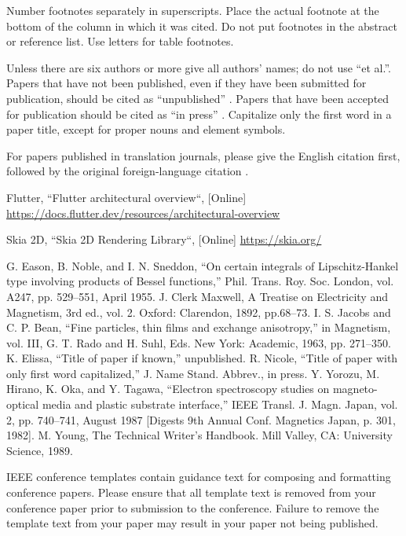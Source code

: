 \documentclass[conference]{IEEEtran}
\begin{document}
Number footnotes separately in superscripts. Place the actual footnote at 
the bottom of the column in which it was cited. Do not put footnotes in the 
abstract or reference list. Use letters for table footnotes.

Unless there are six authors or more give all authors' names; do not use 
``et al.''. Papers that have not been published, even if they have been 
submitted for publication, should be cited as ``unpublished'' \cite{b4}. Papers 
that have been accepted for publication should be cited as ``in press'' \cite{b5}. 
Capitalize only the first word in a paper title, except for proper nouns and 
element symbols.

For papers published in translation journals, please give the English 
citation first, followed by the original foreign-language citation \cite{b6}.

\begin{thebibliography}{00}
 Flutter, ``Flutter architectural overview``, [Online] \url{https://docs.flutter.dev/resources/architectural-overview}
	
 Skia 2D, ``Skia 2D Rendering Library``, [Online]
\url{https://skia.org/}
	
 G. Eason, B. Noble, and I. N. Sneddon, ``On certain integrals of Lipschitz-Hankel type involving products of Bessel functions,'' Phil. Trans. Roy. Soc. London, vol. A247, pp. 529--551, April 1955.
 J. Clerk Maxwell, A Treatise on Electricity and Magnetism, 3rd ed., vol. 2. Oxford: Clarendon, 1892, pp.68--73.
 I. S. Jacobs and C. P. Bean, ``Fine particles, thin films and exchange anisotropy,'' in Magnetism, vol. III, G. T. Rado and H. Suhl, Eds. New York: Academic, 1963, pp. 271--350.
 K. Elissa, ``Title of paper if known,'' unpublished.
 R. Nicole, ``Title of paper with only first word capitalized,'' J. Name Stand. Abbrev., in press.
 Y. Yorozu, M. Hirano, K. Oka, and Y. Tagawa, ``Electron spectroscopy studies on magneto-optical media and plastic substrate interface,'' IEEE Transl. J. Magn. Japan, vol. 2, pp. 740--741, August 1987 [Digests 9th Annual Conf. Magnetics Japan, p. 301, 1982].
 M. Young, The Technical Writer's Handbook. Mill Valley, CA: University Science, 1989.
\end{thebibliography}
\vspace{12pt}
\color{red}
IEEE conference templates contain guidance text for composing and formatting conference papers. Please ensure that all template text is removed from your conference paper prior to submission to the conference. Failure to remove the template text from your paper may result in your paper not being published.
\end{document}
